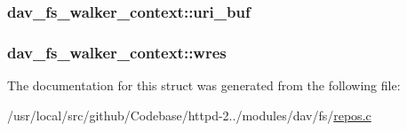 \subsubsection[{\texorpdfstring{uri\+\_\+buf}{uri_buf}}]{ dav\+\_\+fs\+\_\+walker\+\_\+context\+::uri\+\_\+buf}\hypertarget{structdav__fs__walker__context_a43f153ce977e7131c75be802d9f7e9f9}{}\label{structdav__fs__walker__context_a43f153ce977e7131c75be802d9f7e9f9}
\subsubsection[{\texorpdfstring{wres}{wres}}]{ dav\+\_\+fs\+\_\+walker\+\_\+context\+::wres}\hypertarget{structdav__fs__walker__context_a3b61c3a87ff7b3d88e985851d71cf963}{}\label{structdav__fs__walker__context_a3b61c3a87ff7b3d88e985851d71cf963}


The documentation for this struct was generated from the following file\+:\begin{DoxyCompactItemize}
\item 
/usr/local/src/github/\+Codebase/httpd-\/2../modules/dav/fs/\hyperlink{repos_8c}{repos.\+c}\end{DoxyCompactItemize}
